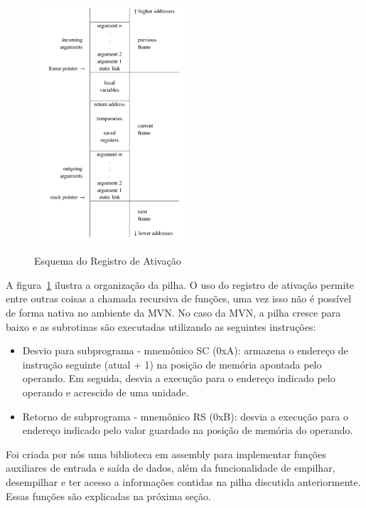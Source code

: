 \begin{figure}[ht]
	\centering
	\caption{Esquema do Registro de Ativação}
	\includegraphics[width=0.5\textwidth]{images/registros-ativacao.png}
	\label{fig:registros-ativacao}
\end{figure}

A figura~\ref{fig:registros-ativacao} ilustra a organização da pilha. O uso do registro de ativação permite entre outras coisas a chamada recursiva de funções, uma vez isso não é possível de forma nativa no ambiente da MVN. No caso da MVN, a pilha cresce para baixo e as subrotinas são executadas utilizando as seguintes instruções:

\begin{itemize}
	\item Desvio para subprograma - mnemônico SC (0xA): armazena o endereço de instrução seguinte (atual + 1) na posição de memória apontada pelo operando. Em seguida, desvia a execução para o endereço indicado pelo operando e acrescido de uma unidade.
	
	\item Retorno de subprograma - mnemônico RS (0xB): desvia a execução para o endereço indicado pelo valor guardado na posição de memória do operando.
\end{itemize}

Foi criada por nós uma biblioteca em assembly para implementar funções auxiliares de entrada e saída de dados, além da funcionalidade de empilhar, desempilhar e ter acesso a informações contidas na pilha discutida anteriormente. Essas funções são explicadas na próxima seção.

